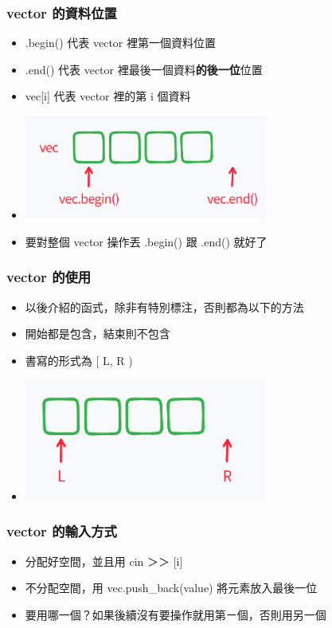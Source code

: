 \documentclass{beamer}
\begin{document}
\begin{frame}
    \frametitle{vector 的資料位置}
    \begin{itemize}
        \item .begin() 代表 vector 裡第一個資料位置
        \item .end() 代表 vector 裡最後一個資料\textbf{的後一位}位置
        \item vec[i] 代表 vector 裡的第 i 個資料
        \item<2-> \includegraphics[width=8.0cm]{img/img_2.png}
        \item<2-> 要對整個 vector 操作丟 .begin() 跟 .end() 就好了
    \end{itemize}
\end{frame}

\begin{frame}
    \frametitle{vector 的使用}
    \begin{itemize}
        \item 以後介紹的函式，除非有特別標注，否則都為以下的方法
        \item 開始都是包含，結束則不包含
        \item 書寫的形式為 [ L, R )
        \item \includegraphics[width=8.0cm]{img/img_3.png}
    \end{itemize}
\end{frame}

\begin{frame}
    \frametitle{vector 的輸入方式}
    \begin{itemize}
        \item 分配好空間，並且用 cin ＞＞ [i]
        \item 不分配空間，用 vec.push\_back({\color[rgb]{1,0,0}value}) 將元素放入最後一位
        \vspace{0.5cm}
        \item 要用哪一個？如果後續沒有要操作就用第ㄧ個，否則用另一個
    \end{itemize}
\end{frame}
\end{document}
